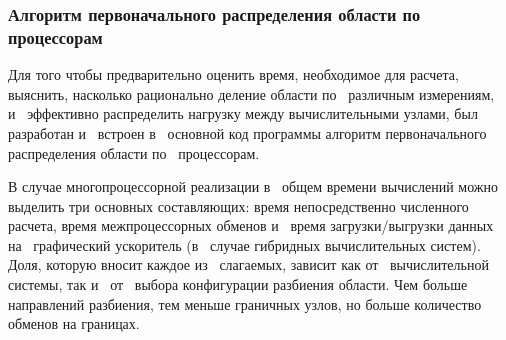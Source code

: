 \subsubsection{Алгоритм первоначального распределения области по процессорам}

Для того чтобы предварительно оценить время, необходимое для расчета, выяснить, насколько 
рационально деление области по~ различным измерениям, и~ эффективно распределить нагрузку
между вычислительными узлами, был разработан и~ встроен в~ основной код программы
алгоритм первоначального распределения области по~ процессорам.

В случае многопроцессорной реализации в~ общем времени вычислений можно выделить
три основных составляющих: время непосредственно численного расчета, время
межпроцессорных обменов и~ время загрузки/выгрузки данных на~ графический ускоритель 
(в~ случае гибридных вычислительных систем). Доля, которую вносит каждое из~
слагаемых, зависит как от~ вычислительной системы, так и~ от~ выбора конфигурации разбиения
области. Чем больше направлений разбиения, тем меньше граничных узлов, но
больше количество обменов на границах.

